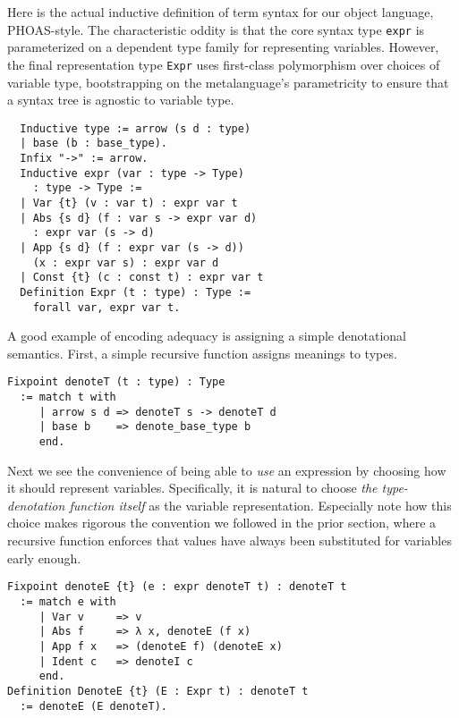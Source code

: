 \documentclass[sigplan,10pt,review,anonymous]{acmart}\settopmatter{printfolios=true,printccs=false,printacmref=false}
\begin{document}
Here is the actual inductive definition of term syntax for our object language, PHOAS-style.
The characteristic oddity is that the core syntax type \texttt{expr} is parameterized on a dependent type family for representing variables.
However, the final representation type \texttt{Expr} uses first-class polymorphism over choices of variable type, bootstrapping on the metalanguage's parametricity to ensure that a syntax tree is agnostic to variable type.
\begin{verbatim}
  Inductive type := arrow (s d : type)
  | base (b : base_type).
  Infix "->" := arrow.
  Inductive expr (var : type -> Type)
    : type -> Type :=
  | Var {t} (v : var t) : expr var t
  | Abs {s d} (f : var s -> expr var d)
    : expr var (s -> d)
  | App {s d} (f : expr var (s -> d))
    (x : expr var s) : expr var d
  | Const {t} (c : const t) : expr var t
  Definition Expr (t : type) : Type :=
    forall var, expr var t.
\end{verbatim}

A good example of encoding adequacy is assigning a simple denotational semantics.
First, a simple recursive function assigns meanings to types.
\begin{verbatim}
Fixpoint denoteT (t : type) : Type
  := match t with
     | arrow s d => denoteT s -> denoteT d
     | base b    => denote_base_type b
     end.
\end{verbatim}

Next we see the convenience of being able to \emph{use} an expression by choosing how it should represent variables.
Specifically, it is natural to choose \emph{the type-denotation function itself} as the variable representation.
Especially note how this choice makes rigorous the convention we followed in the prior section, where a recursive function enforces that values have always been substituted for variables early enough.
\begin{verbatim}
Fixpoint denoteE {t} (e : expr denoteT t) : denoteT t
  := match e with
     | Var v     => v
     | Abs f     => λ x, denoteE (f x)
     | App f x   => (denoteE f) (denoteE x)
     | Ident c   => denoteI c
     end.
Definition DenoteE {t} (E : Expr t) : denoteT t
  := denoteE (E denoteT).
\end{verbatim}
\end{document}

